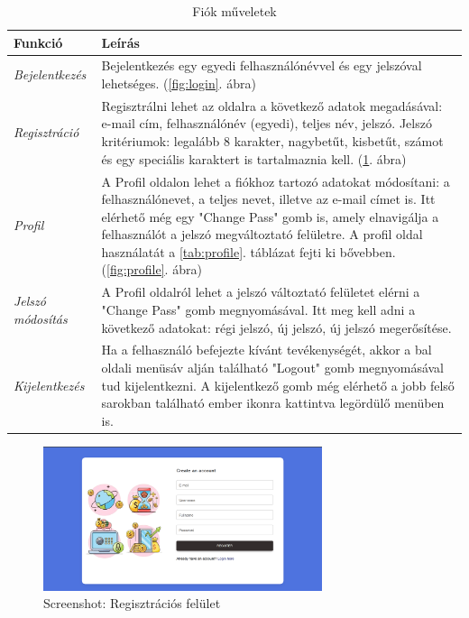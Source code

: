 \begin{table}[H]
	\centering
	\begin{tabular}{ | m{} | m{} | }
		\hline
		\textbf{Funkció} & \textbf{Leírás} \\
		\hline \hline
		\emph{Bejelentkezés} & Bejelentkezés egy egyedi felhasználónévvel és egy jelszóval lehetséges. (\ref{fig:login}. ábra) \\
		\hline
		\emph{Regisztráció} &  Regisztrálni lehet az oldalra a következő adatok megadásával: e-mail cím, felhasználónév (egyedi), teljes név, jelszó. Jelszó kritériumok: legalább 8 karakter, nagybetűt, kisbetűt, számot és egy speciális karaktert is tartalmaznia kell. (\ref{fig:register}. ábra)  \\
		\hline
		\emph{Profil} & A Profil oldalon lehet a fiókhoz tartozó adatokat módosítani: a felhasználónevet, a teljes nevet, illetve az e-mail címet is. Itt elérhető még egy "Change Pass" gomb is, amely elnavigálja a felhasználót a jelszó megváltoztató felületre. A profil oldal használatát a \ref{tab:profile}. táblázat fejti ki bővebben. (\ref{fig:profile}. ábra) \\
		\hline
		\emph{Jelszó módosítás} & A Profil oldalról lehet a jelszó változtató felületet elérni a "Change Pass" gomb megnyomásával. Itt meg kell adni a következő adatokat: régi jelszó, új jelszó, új jelszó megerősítése. \\
		\hline
		\emph{Kijelentkezés} & Ha a felhasználó befejezte kívánt tevékenységét, akkor a bal oldali menüsáv alján található "Logout" gomb megnyomásával tud kijelentkezni. A kijelentkező gomb még elérhető a jobb felső sarokban található ember ikonra kattintva legördülő menüben is. \\
		\hline
	\end{tabular}
	\caption{Fiók műveletek}
	\label{tab:account}
\end{table}

\begin{figure}[H]
	\centering
	\includegraphics[height=160px]{img/register}
	\caption{Screenshot: Regisztrációs felület}
	\label{fig:register}
\end{figure}

